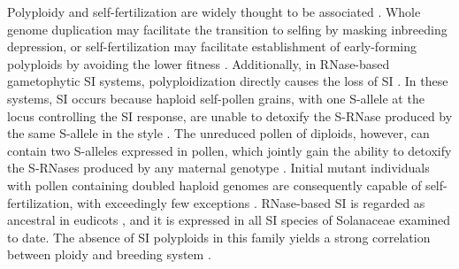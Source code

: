 Polyploidy and self-fertilization are widely thought to be associated \citep{stebbins1950}.
Whole genome duplication may facilitate the transition to selfing by masking inbreeding depression, or self-fertilization may facilitate establishment of early-forming polyploids by avoiding the lower fitness \citep{levin_1975,ramsey_1998, barringer2007, barrett2008, husband2008}.%
Additionally, in RNase-based gametophytic SI systems, polyploidization directly causes the loss of SI \citep{stout1942, lewis1947}.
In these systems, SI occurs because haploid self-pollen grains, with one S-allele at the locus controlling the SI response, are unable to detoxify the S-RNase produced by the same S-allele in the style \citep{kubo2010}.
The unreduced pollen of diploids, however, can contain two S-alleles expressed in pollen, which jointly gain the ability to detoxify the S-RNases produced by any maternal genotype \citep{entani1999, tsukamoto2005, kubo2010}.
Initial mutant individuals with pollen containing doubled haploid genomes are consequently capable of self-fertilization, with exceedingly few exceptions \citep{hauck_2002, nunes_2006}.
RNase-based SI is regarded as ancestral in eudicots \citep{igic_2001,steinbachs_2002}, and it is expressed in all SI species of Solanaceae examined to date.
The absence of SI polyploids in this family yields a strong correlation between ploidy and breeding system \citep{robertson_2011}.

